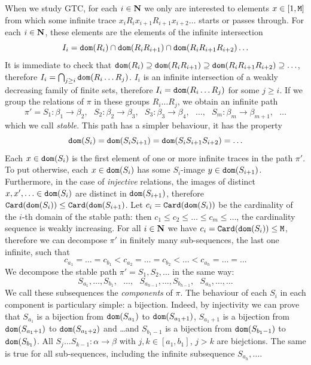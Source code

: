 \documentclass{lmcs}
\begin{document}
When we study GTC, for each $i \in {\bf N}$ we only are interested to elements $x \in [1,{\tt M}]$
from which some infinite trace $x_i R_i x_{i+1} R_{i+1} x_{i+2} \ldots$ starts or
passes through. For each $i \in {\bf N}$, these elements are the elements of the infinite intersection
$$
I_i = {\tt dom}(R_i) \cap {\tt dom}(R_i R_{i+1}) \cap {\tt dom}(R_i R_{i+1} R_{i+2}) \ldots
$$
It is immediate to check that 
$
{\tt dom}(R_i) \supseteq 
{\tt dom}(R_i R_{i+1}) \supseteq 
{\tt dom}(R_i R_{i+1} R_{i+2}) \supseteq 
\ldots
$,
therefore $I_i = \bigcap_{j \ge i} {\tt dom}(R_i \ldots R_j)$. $I_i$ is an infinite intersection of a
weakly decreasing family of finite sets, therefore $I_i = {\tt dom}(R_i \ldots R_j)$ 
for some $j \ge i$. If we group the relations of $\pi$ in these groups
$R_i \ldots R_j$, we obtain an infinite path 
$$
\pi' = 
S_1:\beta_1 \rightarrow \beta_2, \ \ \ 
S_2:\beta_2 \rightarrow \beta_3, \ \ \  
S_3:\beta_3 \rightarrow \beta_4, \ \ \  
\ldots, \ \ \ 
S_m:\beta_m \rightarrow \beta_{m+1}, \ \ \ 
\ldots
$$ 
which we call \emph{stable}. This path has a simpler behaviour, it has the property
$$
{\tt dom}(S_i) = 
{\tt dom}(S_i S_{i+1}) =
{\tt dom}(S_i S_{i+1} S_{i+2}) =
\ldots
$$
Each $x \in {\tt dom}(S_i)$ is the first element of one or more infinite traces in the path $\pi'$.
To put otherwise, each $x \in {\tt dom}(S_i)$ has some $S_i$-image $y \in {\tt dom}(S_{i+1})$.
Furthermore, in the case of \emph{injective} relations, the images of distinct $x, x', \ldots
\in {\tt dom}(S_i)$ are distinct in $ {\tt dom}(S_{i+1})$, therefore
${\tt Card}({\tt dom}(S_i)) \le {\tt Card}({\tt dom}(S_{i+1})$. Let $c_i = {\tt Card}({\tt dom}(S_i))$ be the cardinality
of the $i$-th domain of the stable path: then $c_1 \le c_2 \le \ldots \le c_m \le \ldots$,
the cardinality sequence is weakly increasing. 
For all $i \in {\bf N}$ we have $c_i = {\tt Card}({\tt dom}(S_i)) \le {\tt M}$, therefore
we can decompose $\pi'$ in finitely many sub-sequences, the last one infinite, such that  
$$
c_{a_1} = \ldots = c_{b_1}   < 
c_{a_2} = \ldots = c_{b_2}   < 
\ldots                                       <
c_{a_h} = \ldots = \ldots 
$$
We decompose the stable path $\pi' = S_1, S_2, \ldots$ in the same way:
$$
S_{a_1}, \ldots, S_{b_1}, \ \ \ 
\ldots, \ \ \ 
S_{a_{h-1}}, \ldots, S_{b_{h-1}}, \ \ \ 
S_{a_{h}}, \ldots, \ldots
$$ 
We call these subsequences the \emph{components} of $\pi$. The behaviour of each
$S_i$ in each component is particulary simple: a bijection.
Indeed, by injectivity we can prove that $S_{a_1}$ is a bijection from 
${\tt dom}(S_{a_1})$ to ${\tt dom}(S_{a_1 + 1})$, $S_{a_1 + 1}$ is a bijection from 
${\tt dom}(S_{a_1 + 1})$ to ${\tt dom}(S_{a_1 + 2})$ and \ldots and 
$S_{b_1 - 1}$ is a bijection from ${\tt dom}(S_{b_1 - 1})$ to ${\tt dom}(S_{b_1})$.
All $S_j \ldots S_{k-1} : \alpha \rightarrow \beta$ with $j, k \in [a_1, b_1]$, $j>k$
are biejctions.
The same is true for all sub-sequences, including the infinite subsequence $S_{a_{h}}, \ldots$.
\end{document}
